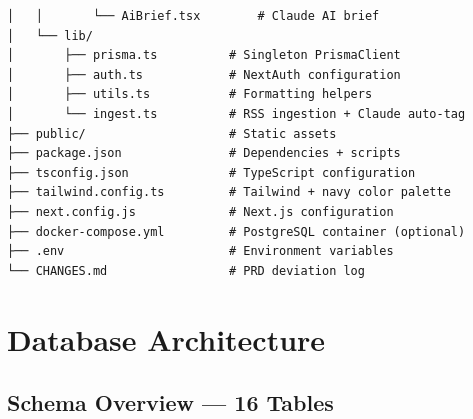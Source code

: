 \documentclass[12pt,a4paper]{article}
\begin{document}
\begin{lstlisting}[caption={Directory Tree},label={lst:tree}]
│   │       └── AiBrief.tsx        # Claude AI brief
│   └── lib/
│       ├── prisma.ts          # Singleton PrismaClient
│       ├── auth.ts            # NextAuth configuration
│       ├── utils.ts           # Formatting helpers
│       └── ingest.ts          # RSS ingestion + Claude auto-tag
├── public/                    # Static assets
├── package.json               # Dependencies + scripts
├── tsconfig.json              # TypeScript configuration
├── tailwind.config.ts         # Tailwind + navy color palette
├── next.config.js             # Next.js configuration
├── docker-compose.yml         # PostgreSQL container (optional)
├── .env                       # Environment variables
└── CHANGES.md                 # PRD deviation log
\end{lstlisting}

\newpage

\section{Database Architecture}

\subsection{Schema Overview — 16 Tables}
\end{document}
